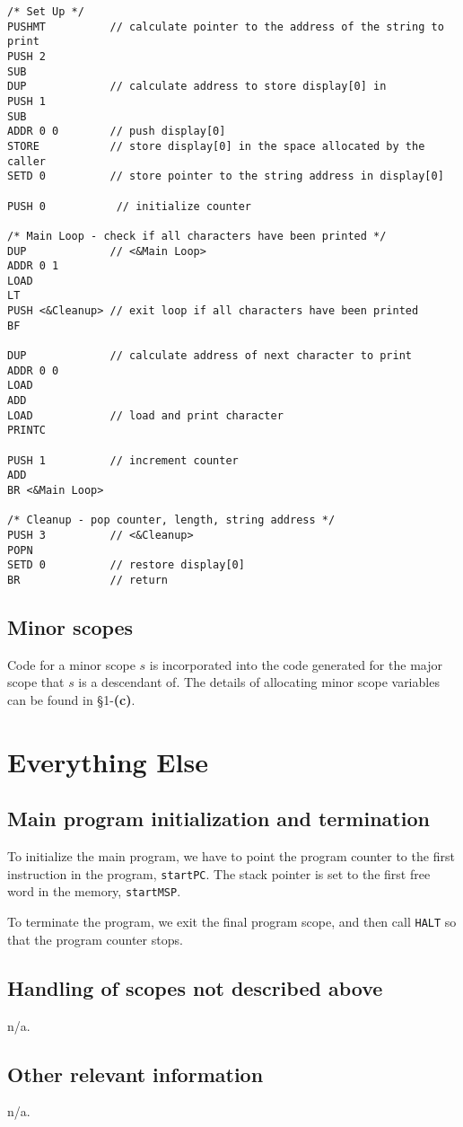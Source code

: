 \documentclass[11pt]{article}
\begin{document}
\begin{verbatim}
/* Set Up */
PUSHMT          // calculate pointer to the address of the string to print
PUSH 2
SUB
DUP             // calculate address to store display[0] in
PUSH 1
SUB
ADDR 0 0        // push display[0]
STORE           // store display[0] in the space allocated by the caller
SETD 0          // store pointer to the string address in display[0]

PUSH 0           // initialize counter

/* Main Loop - check if all characters have been printed */
DUP             // <&Main Loop>
ADDR 0 1
LOAD
LT
PUSH <&Cleanup> // exit loop if all characters have been printed
BF

DUP             // calculate address of next character to print
ADDR 0 0
LOAD
ADD
LOAD            // load and print character
PRINTC

PUSH 1          // increment counter
ADD
BR <&Main Loop>

/* Cleanup - pop counter, length, string address */
PUSH 3          // <&Cleanup>
POPN
SETD 0          // restore display[0]
BR              // return
\end{verbatim}

\subsection{Minor scopes}

Code for a minor scope $s$ is incorporated into the code generated for the major scope that $s$ is a descendant of. The details of allocating minor scope variables can be found in \S 1-\textbf{(c)}.

\section{Everything Else}

\subsection{Main program initialization and termination}

To initialize the main program, we have to point the program counter to the first instruction in the program, \texttt{startPC}. The stack pointer is set to the first free word in the memory, \texttt{startMSP}.

To terminate the program, we exit the final program scope, and then call \texttt{HALT} so that the program counter stops.

\subsection{Handling of scopes not described above}

n/a.

\subsection{Other relevant information}

n/a.
\end{document}
